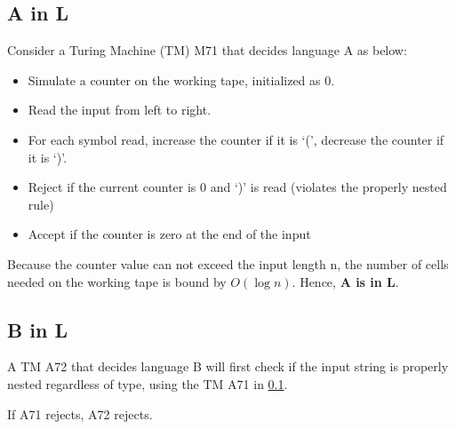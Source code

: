 \documentclass{article}
\begin{document}
\subsection{A in L} \label{7.1}
Consider a Turing Machine (TM) M71 that decides language A as below:
\begin{itemize}
    \item Simulate a counter on the working tape, initialized as 0.
    \item Read the input from left to right.
    \item For each symbol read, increase the counter if it is `(', decrease the counter if it is `)'.
    \item Reject if the current counter is 0 and `)' is read (violates the properly nested rule)
    \item Accept if the counter is zero at the end of the input
\end{itemize}

Because the counter value can not exceed the input length n, the number of cells needed on the working tape is bound by $O(\log n)$. Hence, \textbf{A is in L}.

\subsection{B in L}
A TM A72 that decides language B will first check if the input string is properly nested regardless of type, using the TM A71 in \ref{7.1}.

If A71 rejects, A72 rejects.
\end{document}

